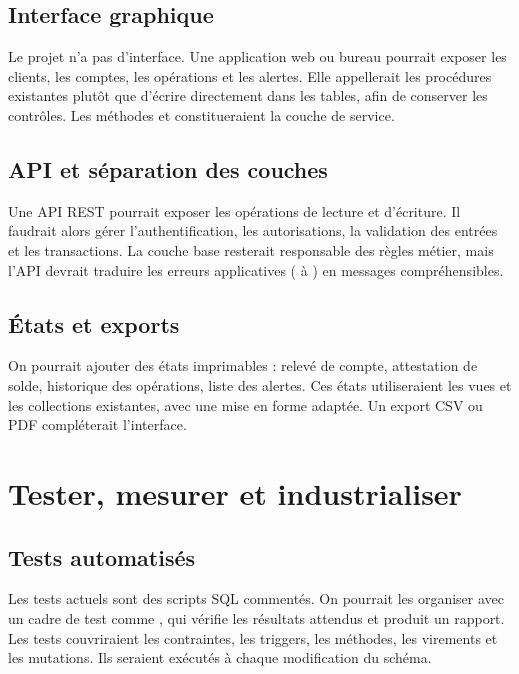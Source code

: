 \subsection{Interface graphique}

Le projet n'a pas d'interface. Une application web ou bureau pourrait exposer
les clients, les comptes, les opérations et les alertes. Elle appellerait les
procédures existantes plutôt que d'écrire directement dans les tables, afin de
conserver les contrôles. Les méthodes  et 
constitueraient la couche de service.

\subsection{API et séparation des couches}

Une API REST pourrait exposer les opérations de lecture et d'écriture. Il
faudrait alors gérer l'authentification, les autorisations, la validation des
entrées et les transactions. La couche base resterait responsable des règles
métier, mais l'API devrait traduire les erreurs applicatives
( à ) en messages compréhensibles.

\subsection{États et exports}

On pourrait ajouter des états imprimables : relevé de compte, attestation de
solde, historique des opérations, liste des alertes. Ces états utiliseraient
les vues et les collections existantes, avec une mise en forme adaptée. Un
export CSV ou PDF compléterait l'interface.

\section{Tester, mesurer et industrialiser}

\subsection{Tests automatisés}

Les tests actuels sont des scripts SQL commentés. On pourrait les organiser
avec un cadre de test comme , qui vérifie les résultats attendus
et produit un rapport. Les tests couvriraient les contraintes, les triggers,
les méthodes, les virements et les mutations. Ils seraient exécutés à chaque
modification du schéma.

